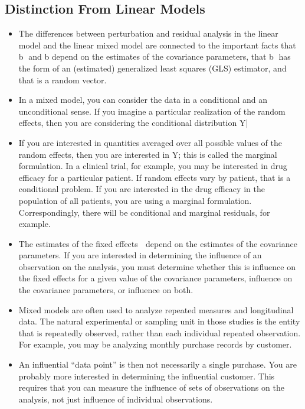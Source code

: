 \documentclass[Main.tex]{subfiles}
\begin{document}
\begin{itemize}
\section{Distinction From Linear Models}
	\begin{itemize}
		\item The differences between perturbation and residual analysis in the linear model and the linear mixed model
		are connected to the important facts that b and b
		depend on the estimates of the covariance parameters,
		that b has the form of an (estimated) generalized least squares (GLS) estimator, and that 
		is a random
		vector.
		\item In a mixed model, you can consider the data in a conditional and an unconditional sense. If you imagine
		a particular realization of the random effects, then you are considering the conditional distribution
		Y|
		\item If you are interested in quantities averaged over all possible values of the random effects, then
		you are interested in Y; this is called the marginal formulation. In a clinical trial, for example, you
		may be interested in drug efficacy for a particular patient. If random effects vary by patient, that is a
		conditional problem. If you are interested in the drug efficacy in the population of all patients, you are
		using a marginal formulation. Correspondingly, there will be conditional and marginal residuals, for
		example.
		\item The estimates of the fixed effects  depend on the estimates of the covariance parameters. If you are
		interested in determining the influence of an observation on the analysis, you must determine whether
		this is influence on the fixed effects for a given value of the covariance parameters, influence on the
		covariance parameters, or influence on both.
		\item Mixed models are often used to analyze repeated measures and longitudinal data. The natural experimental
		or sampling unit in those studies is the entity that is repeatedly observed, rather than each
		individual repeated observation. For example, you may be analyzing monthly purchase records by
		customer. 
		\item An influential “data point” is then not necessarily a single purchase. You are probably more
		interested in determining the influential customer. This requires that you can measure the influence
		of sets of observations on the analysis, not just influence of individual observations.

\end{itemize}
\end{itemize}
\end{document}
